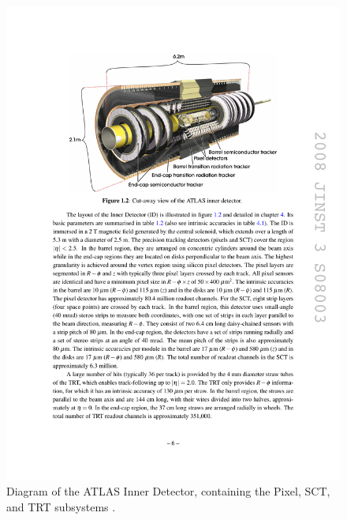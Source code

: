 \begin{centering}
\begin{figure}[!htb]
\myfloatalign
\includegraphics[width=.90\linewidth]{figures/atlas/innerdetector.pdf}
\caption{Diagram of the \ac{ATLAS} Inner Detector, containing the Pixel, SCT, and TRT subsystems \cite{PERF-2007-01}.}
\label{fig:ID}
\end{figure}
\end{centering}

